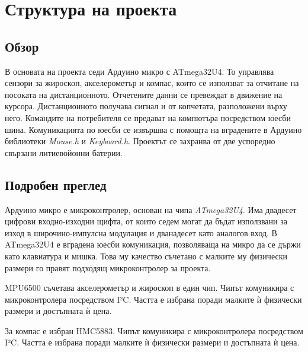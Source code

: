 \documentclass[a4paper,14pt]{extreport}
\begin{document}
\chapter{Структура на проекта}
\section{Обзор}
В основата на проекта седи Ардуино микро с ATmega32U4. То управлява сензори за жироскоп,
акселерометър и компас, които се използват за отчитане на посоката на дистанционното. Отчетените
данни се превеждат в движение на курсора. Дистанционното получава сигнал и от копчетата, разположени
върху него. Командите на потребителя се предават на компютъра посредством юесби шина. Комуникацията
по юесби се извършва с помощта на вградените в Ардуино библиотеки \textit{Mouse.h} и
\textit{Keyboard.h}. Проектът се захранва от две успоредно свързани литиевойонни
батерии.

\section{Подробен преглед}
Ардуино микро е микроконтролер, основан на чипа \textit{ATmega32U4}. Има двадесет цифрови
входно-изходни щифта, от които седем могат да бъдат използвани за изход в широчино-импулсна
модулация и дванадесет като аналогов вход. В ATmega32U4 е вградена юесби комуникация, позволяваща на
микро да се държи като клавиатура и мишка. Това му качество съчетано с малките му физически размери
го правят подходящ микроконтролер за проекта.

MPU6500 съчетава акселерометър и жироскоп в един чип. Чипът комуникира с микроконтролера посредством
I²C. Частта е избрана поради малките ѝ физически размери и достъпната ѝ цена.

За компас е избран HMC5883. Чипът комуникира с микроконтролера посредством I²C. Частта е избрана
поради малките ѝ физически размери и достъпната ѝ цена.
\end{document}
